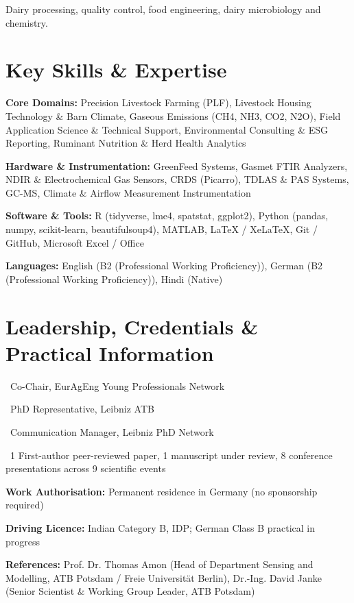 \documentclass[10pt,a4paper]{article}
\begin{document}

{\small Dairy processing, quality control, food engineering, dairy microbiology and chemistry.}\par



\section*{Key Skills \& Expertise}
\textbf{Core Domains:} Precision Livestock Farming (PLF), Livestock Housing Technology \& Barn Climate, Gaseous Emissions (CH4, NH3, CO2, N2O), Field Application Science \& Technical Support, Environmental Consulting \& ESG Reporting, Ruminant Nutrition \& Herd Health Analytics\par

\textbf{Hardware \& Instrumentation:} GreenFeed Systems, Gasmet FTIR Analyzers, NDIR \& Electrochemical Gas Sensors, CRDS (Picarro), TDLAS \& PAS Systems, GC-MS, Climate \& Airflow Measurement Instrumentation\par

\textbf{Software \& Tools:} R (tidyverse, lme4, spatstat, ggplot2), Python (pandas, numpy, scikit-learn, beautifulsoup4), MATLAB, LaTeX / XeLaTeX, Git / GitHub, Microsoft Excel / Office\par
\textbf{Languages:} English (B2 (Professional Working Proficiency)), German (B2 (Professional Working Proficiency)), Hindi (Native)


\section*{Leadership, Credentials \& Practical Information}

\textbullet\ Co-Chair, EurAgEng Young Professionals Network\par

\textbullet\ PhD Representative, Leibniz ATB\par

\textbullet\ Communication Manager, Leibniz PhD Network\par

\textbullet\ 1 First-author peer-reviewed paper, 1 manuscript under review, 8 conference presentations across 9 scientific events\par

\textbf{Work Authorisation:} Permanent residence in Germany (no sponsorship required)\par

\textbf{Driving Licence:} Indian Category B, IDP; German Class B practical in progress\par


\textbf{References:} Prof. Dr. Thomas Amon (Head of Department Sensing and Modelling, ATB Potsdam / Freie Universität Berlin), Dr.-Ing. David Janke (Senior Scientist \& Working Group Leader, ATB Potsdam)
\end{document}
